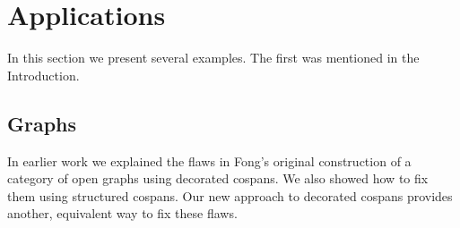\documentclass[reqno]{amsart}
\begin{document}

\section{Applications}\label{Applications}

In this section we present several examples.  The first was mentioned in the Introduction.

\subsection{Graphs}
\label{subsec:graphs}

In earlier work \cite[Sec.\ 5]{BC} we explained the flaws in Fong's original construction of a category of open graphs using decorated cospans.  We also showed how to fix them using structured cospans. Our new approach to decorated cospans provides another, equivalent way to fix these flaws.
\end{document}
